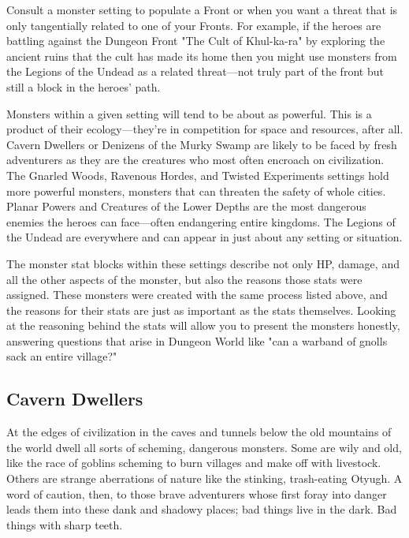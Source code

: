  

Consult a monster setting to populate a Front or when you want a threat that is only tangentially related to one of your Fronts. For example, if the heroes are battling against the Dungeon Front "The Cult of Khul-ka-ra" by exploring the ancient ruins that the cult has made its home then you might use monsters from the Legions of the Undead as a related threat—not truly part of the front but still a block in the heroes' path.

 

Monsters within a given setting will tend to be about as powerful. This is a product of their ecology—they're in competition for space and resources, after all. Cavern Dwellers or Denizens of the Murky Swamp are likely to be faced by fresh adventurers as they are the creatures who most often encroach on civilization. The Gnarled Woods, Ravenous Hordes, and Twisted Experiments settings hold more powerful monsters, monsters that can threaten the safety of whole cities. Planar Powers and Creatures of the Lower Depths are the most dangerous enemies the heroes can face—often endangering entire kingdoms. The Legions of the Undead are everywhere and can appear in just about any setting or situation.

 

The monster stat blocks within these settings describe not only HP, damage, and all the other aspects of the monster, but also the reasons those stats were assigned. These monsters were created with the same process listed above, and the reasons for their stats are just as important as the stats themselves. Looking at the reasoning behind the stats will allow you to present the monsters honestly, answering questions that arise in Dungeon World like "can a warband of gnolls sack an entire village?"

 
\subsection{Cavern Dwellers}    
 

At the edges of civilization in the caves and tunnels below the old mountains of the world dwell all sorts of scheming, dangerous monsters. Some are wily and old, like the race of goblins scheming to burn villages and make off with livestock. Others are strange aberrations of nature like the stinking, trash-eating Otyugh. A word of caution, then, to those brave adventurers whose first foray into danger leads them into these dank and shadowy places; bad things live in the dark. Bad things with sharp teeth.

